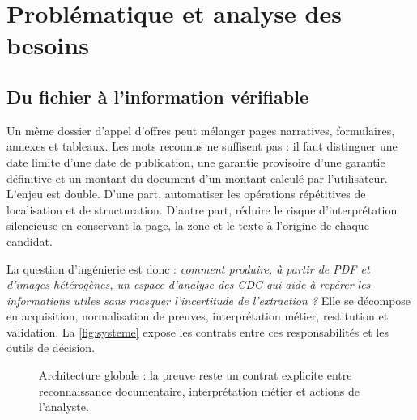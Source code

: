 \chapter{Problématique et analyse des besoins}\label{chap:besoins}
\section{Du fichier à l'information vérifiable}
Un même dossier d'appel d'offres peut mélanger pages narratives, formulaires, annexes et tableaux. Les mots reconnus ne suffisent pas : il faut distinguer une date limite d'une date de publication, une garantie provisoire d'une garantie définitive et un montant du document d'un montant calculé par l'utilisateur. L'enjeu est double. D'une part, automatiser les opérations répétitives de localisation et de structuration. D'autre part, réduire le risque d'interprétation silencieuse en conservant la page, la zone et le texte à l'origine de chaque candidat.

La question d'ingénierie est donc : \emph{comment produire, à partir de PDF et d'images hétérogènes, un espace d'analyse des CDC qui aide à repérer les informations utiles sans masquer l'incertitude de l'extraction ?} Elle se décompose en acquisition, normalisation de preuves, interprétation métier, restitution et validation. La \autoref{fig:systeme} expose les contrats entre ces responsabilités et les outils de décision.

\begin{figure}[htbp]\centering
{}
\caption{Architecture globale : la preuve reste un contrat explicite entre reconnaissance documentaire, interprétation métier et actions de l'analyste.}\label{fig:systeme}
\end{figure}

